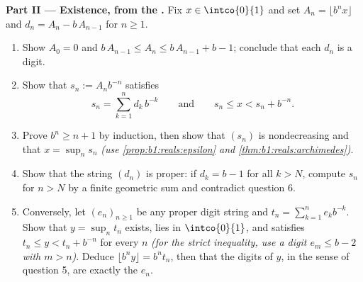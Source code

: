 \begin{problem}
\medskip
\noindent\textbf{Part II --- Existence, from the .} Fix
$x \in \intco{0}{1}$ and set $A_n = \lfloor b^n x \rfloor$ and
$d_n = A_n - b\,A_{n-1}$ for $n \geq 1$.
\begin{enumerate}[resume]
  \item Show $A_0 = 0$ and $b\,A_{n-1} \leq A_n \leq b\,A_{n-1} +
        b - 1$; conclude that each $d_n$ is a digit.
  \item Show that $s_n := A_n b^{-n}$ satisfies
        \[
        s_n = \sum_{k=1}^{n} d_k\,b^{-k}
        \qquad\text{and}\qquad
        s_n \leq x < s_n + b^{-n} .
        \]
  \item Prove $b^n \geq n + 1$ by induction, then show that
        $(s_n)$ is nondecreasing and that $x = \sup_n s_n$
        \emph{(use \cref{prop:b1:reals:epsilon} and
        \cref{thm:b1:reals:archimedes})}.
  \item Show that the string $(d_n)$ is proper: if $d_k = b - 1$
        for all $k > N$, compute $s_n$ for $n > N$ by a finite
        geometric sum and contradict question 6.
  \item Conversely, let $(e_n)_{n \geq 1}$ be any proper digit
        string and $t_n = \sum_{k=1}^n e_k b^{-k}$. Show that $y
        = \sup_n t_n$ exists, lies in $\intco{0}{1}$, and
        satisfies $t_n \leq y < t_n + b^{-n}$ for every $n$
        \emph{(for the strict inequality, use a digit $e_m \leq b
        - 2$ with $m > n$)}. Deduce $\lfloor b^n y \rfloor = b^n
        t_n$, then that the digits of $y$, in the sense of
        question 5, are exactly the $e_n$.
\end{enumerate}


\end{problem}
